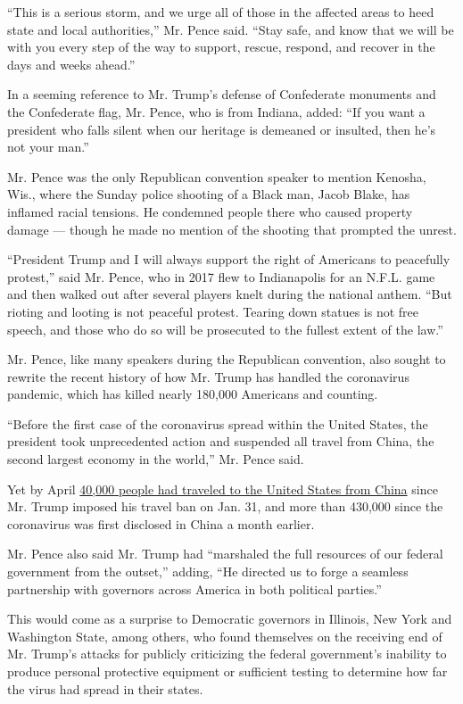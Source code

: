 ``This is a serious storm, and we urge all of those in the affected
areas to heed state and local authorities,'' Mr. Pence said. ``Stay
safe, and know that we will be with you every step of the way to
support, rescue, respond, and recover in the days and weeks ahead.''

In a seeming reference to Mr. Trump's defense of Confederate monuments
and the Confederate flag, Mr. Pence, who is from Indiana, added: ``If
you want a president who falls silent when our heritage is demeaned or
insulted, then he's not your man.''

Mr. Pence was the only Republican convention speaker to mention Kenosha,
Wis., where the Sunday police shooting of a Black man, Jacob Blake, has
inflamed racial tensions. He condemned people there who caused property
damage --- though he made no mention of the shooting that prompted the
unrest.

``President Trump and I will always support the right of Americans to
peacefully protest,'' said Mr. Pence, who in 2017 flew to Indianapolis
for an N.F.L. game and then walked out after several players knelt
during the national anthem. ``But rioting and looting is not peaceful
protest. Tearing down statues is not free speech, and those who do so
will be prosecuted to the fullest extent of the law.''

Mr. Pence, like many speakers during the Republican convention, also
sought to rewrite the recent history of how Mr. Trump has handled the
coronavirus pandemic, which has killed nearly 180,000 Americans and
counting.

``Before the first case of the coronavirus spread within the United
States, the president took unprecedented action and suspended all travel
from China, the second largest economy in the world,'' Mr. Pence said.

Yet by April
\href{https://www.nytimes3xbfgragh.onion/2020/04/04/us/coronavirus-china-travel-restrictions.html}{40,000
people had traveled to the United States from China} since Mr. Trump
imposed his travel ban on Jan. 31, and more than 430,000 since the
coronavirus was first disclosed in China a month earlier.

Mr. Pence also said Mr. Trump had ``marshaled the full resources of our
federal government from the outset,'' adding, ``He directed us to forge
a seamless partnership with governors across America in both political
parties.''

This would come as a surprise to Democratic governors in Illinois, New
York and Washington State, among others, who found themselves on the
receiving end of Mr. Trump's attacks for publicly criticizing the
federal government's inability to produce personal protective equipment
or sufficient testing to determine how far the virus had spread in their
states.

